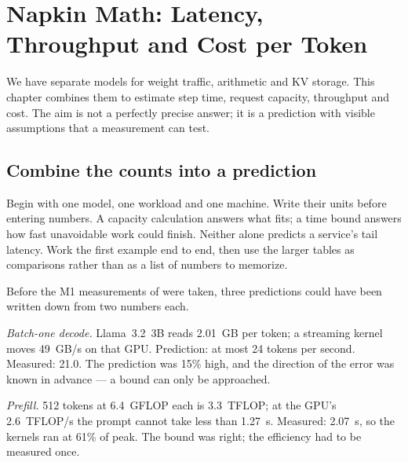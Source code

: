 \chapter{Napkin Math: Latency, Throughput and Cost per Token}\label{ch:napkin-math}

\begin{ChapterIntent}
We have separate models for weight traffic, arithmetic and KV storage. This chapter
combines them to estimate step time, request capacity, throughput and cost. The aim is
not a perfectly precise answer; it is a prediction with visible assumptions that a
measurement can test.
\end{ChapterIntent}

\section*{Combine the counts into a prediction}
Begin with one model, one workload and one machine. Write their units before entering
numbers. A capacity calculation answers what fits; a time bound answers how fast
unavoidable work could finish. Neither alone predicts a service's tail latency. Work the
first example end to end, then use the larger tables as comparisons rather than as a
list of numbers to memorize.


Before the M1 measurements of  were taken, three predictions
could have been written down from two numbers each.

\emph{Batch-one decode.} Llama~3.2~3B reads 2.01~GB per token; a streaming
kernel moves 49~GB/s on that GPU. Prediction: at most 24 tokens per second.
Measured: 21.0. The prediction was 15\% high, and the direction of the error
was known in advance --- a bound can only be approached.

\emph{Prefill.} 512 tokens at 6.4~GFLOP each is 3.3~TFLOP; at the GPU's
2.6~TFLOP/s the prompt cannot take less than 1.27~s. Measured: 2.07~s, so the
kernels ran at 61\% of peak. The bound was right; the efficiency had to be
measured once.

